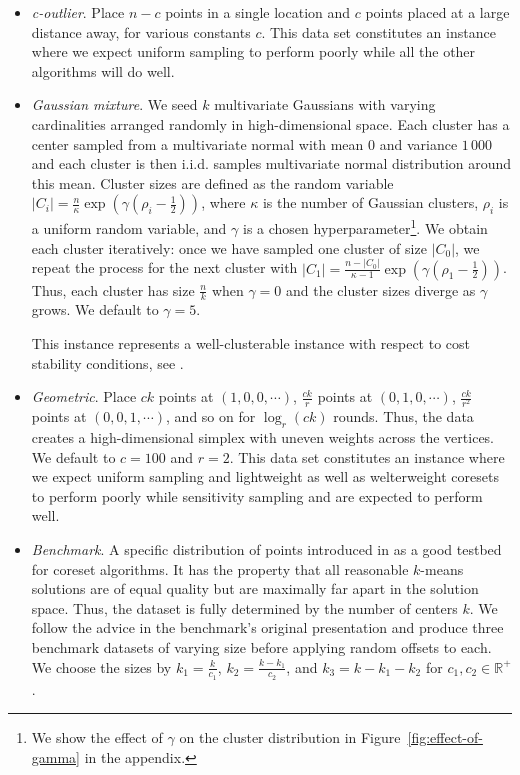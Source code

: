 \begin{itemize}
    \item \emph{c-outlier}. Place $n-c$ points in a single location and $c$ points placed at a large distance away, for various constants $c$. 
	This data set constitutes an instance where we expect uniform sampling to perform poorly while all the other algorithms will do well.

    \item \emph{Gaussian mixture}. We seed $k$ multivariate Gaussians with varying cardinalities arranged randomly in high-dimensional space.  Each cluster has a center sampled from a multivariate normal with mean $0$ and variance $1\,000$ and each cluster is then i.i.d. samples multivariate normal distribution around
        this mean. Cluster sizes are defined as the random variable $|C_i| = \frac{n}{\kappa} \exp \left( \gamma(\rho_i - \frac{1}{2}) \right)$, where $\kappa$
        is the number of Gaussian clusters, $\rho_i$ is a uniform random variable, and $\gamma$ is a chosen hyperparameter\footnote{We show the effect of
        $\gamma$ on the cluster distribution in Figure~\ref{fig:effect-of-gamma} in the appendix.}. We obtain each cluster iteratively: once we have sampled one cluster of size
        $|C_0|$, we repeat the process for the next cluster with $|C_1| = \frac{n - |C_0|}{\kappa-1}\exp \left( \gamma(\rho_1 - \frac{1}{2}) \right)$.  Thus,
        each cluster has size $\frac{n}{k}$ when $\gamma = 0$ and the cluster sizes diverge as $\gamma$ grows. We default to $\gamma = 5$.
        
  This instance represents a well-clusterable instance with respect to cost stability conditions, see \cite{AwS12,Cohen-AddadS17,KuK10,ORSS12}.

    \item \emph{Geometric}. Place $c k$ points at $(1, 0, 0, \cdots)$, $\frac{ck}{r}$ points at $(0, 1, 0, \cdots)$, $\frac{ck}{r^2}$ points
        at $(0, 0, 1, \cdots)$, and so on for $\log_r (ck)$ rounds. Thus, the data creates a high-dimensional simplex with uneven weights across the vertices. We
        default to $c = 100$ and $r=2$. 
	This data set constitutes an instance where we expect uniform sampling and lightweight as well as welterweight coresets to perform poorly while sensitivity sampling and \fkmeans are expected to perform well.

    \item \emph{Benchmark}. A specific distribution of points introduced in \cite{chrisESA} as a good testbed for coreset algorithms.  It has the property that
        all reasonable $k$-means solutions are of equal quality but are maximally far apart in the solution space. Thus, the dataset is fully determined by the
        number of centers $k$. We follow the advice in the benchmark's original presentation and produce three benchmark datasets of varying size before
        applying random offsets to each. We choose the sizes by $k_1 = \frac{k}{c_1}$, $k_2 = \frac{k - k_1}{c_2}$, and $k_3 = k - k_1 - k_2$ for $c_1, c_2 \in
        \mathbb{R}^+$.

\end{itemize}

